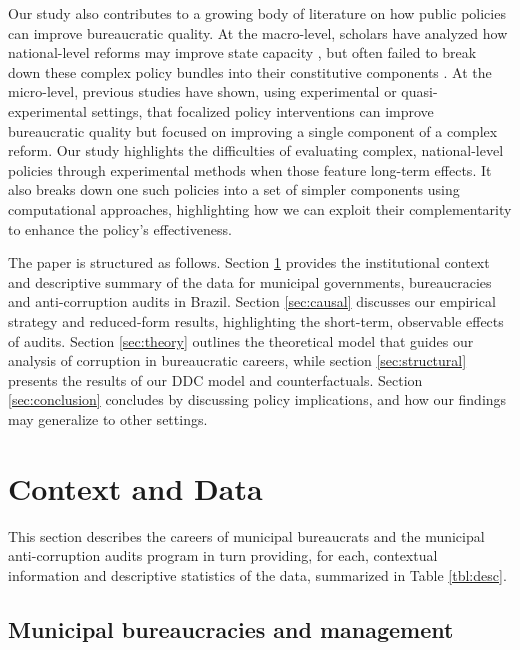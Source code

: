 Our study also contributes to a growing body of literature on how public policies can improve bureaucratic quality. At the macro-level, scholars have analyzed how national-level reforms may improve state capacity \citep{evans_embedded_1995, grindle_jobs_2012}, but often failed to break down these complex policy bundles into their constitutive components \citep{centeno_unpacking_2017}. At the micro-level, previous studies have shown, using experimental or quasi-experimental settings, that focalized policy interventions can improve bureaucratic quality \citep[e.g.][]{duflo_incentives_2012, dal2013strengthening} but focused on improving a single component of a complex reform. Our study highlights the difficulties of evaluating complex, national-level policies through experimental methods when those feature long-term effects. It also breaks down one such policies into a set of simpler components using computational approaches, highlighting how we can exploit their complementarity to enhance the policy's effectiveness.

The paper is structured as follows. Section \ref{sec:data} provides the institutional context and descriptive summary of the data for municipal governments, bureaucracies and anti-corruption audits in Brazil. Section \ref{sec:causal} discusses our empirical strategy and reduced-form results, highlighting the short-term, observable effects of audits. Section \ref{sec:theory} outlines the theoretical model that guides our analysis of corruption in bureaucratic careers, while section \ref{sec:structural} presents the results of our DDC model and counterfactuals. Section \ref{sec:conclusion} concludes by discussing policy implications, and how our findings may generalize to other settings.

\section{Context and Data}
\label{sec:data}


This section describes the careers of municipal bureaucrats and the municipal anti-corruption audits program in turn providing, for each, contextual information and descriptive statistics of the data, summarized in Table \ref{tbl:desc}. 

\subsection{Municipal bureaucracies and management}
\label{sub: municipal}

